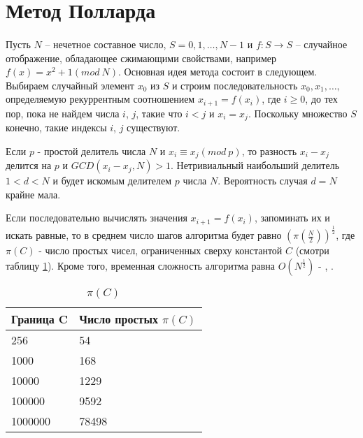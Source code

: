 
\section{Метод Полларда}

\paragraph{} Пусть $N$ – нечетное составное число, $S = {0, 1, \dots, N - 1}$ и $f:S \rightarrow S$ – случайное отображение, 
обладающее сжимающими свойствами, например $f(x)=x^{ 2} + 1(mod \: N)$. Основная идея метода состоит в следующем. Выбираем случайный 
элемент $x_{0}$ из $S$ и строим последовательность $ {x_{0}, x_{1}, \dots, } $
определяемую рекуррентным соотношением $x_{i+1}=f(x_{i})$, где $i \ge 0$, до тех пор, пока не 
найдем числа $i$, $j$, такие что $i < j$ и $x_{i} = x_{j}$. Поскольку множество $S$ 
конечно, такие индексы $i$, $j$ существуют.

  Если $p$ - простой делитель числа $N$ и $x_{i} \equiv x_{j}(mod \: p)$, то разность
$x_{i} - x_{j}$ делится на $p$ и $GCD(x_{i} - x_{j}, N) > 1$. Нетривиальный 
наибольший делитель $1 < d < N$ и будет искомым делителем $p$ числа $N$. Вероятность случая $d = N$ крайне мала.

  Если последовательно вычислять значения $x_{i+1}=f(x_{i})$, запоминать их и искать равные, то в среднем число шагов 
алгоритма будет равно $( \pi (\frac{N}{2}))^{ \frac{1}{2}}$, где $\pi(C)$ - число простых чисел, ограниченных сверху константой $C$ (смотри таблицу \ref{pi-c-label}). 
Кроме того, временная сложность алгоритма равна $O(N^{ \frac{1}{2}})$ - \cite[Глава 2.2, страницы 54-60]{ish11}, \cite[Глава 2.4, страницы 61-65]{ish11}.

  \begin{table}[h]
    \centering
    \begin{tabular}{|l|l|}
    \hline
      Граница C & Число простых $\pi(C)$ \\ \hline
      256       & 54                     \\ \hline
      1000      & 168                    \\ \hline
      10000     & 1229                   \\ \hline
      100000    & 9592                   \\ \hline
      1000000   & 78498                  \\ \hline
    \end{tabular}
    \caption{$\pi(C)$}
    \label{pi-c-label}
  \end{table}

